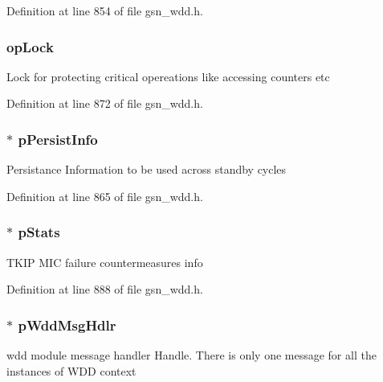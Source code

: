 Definition at line 854 of file gsn\_\-wdd.h.

\hypertarget{a00108_af54b39138c2e6c795c0f67af296e8235}{
\subsubsection[{opLock}]{ {\bf opLock}}}
\label{a00108_af54b39138c2e6c795c0f67af296e8235}
Lock for protecting critical opereations like accessing counters etc 

Definition at line 872 of file gsn\_\-wdd.h.

\hypertarget{a00108_a2352b6f9dfcf66ea61b2b20760fed0c4}{
\subsubsection[{pPersistInfo}]{$\ast$ {\bf pPersistInfo}}}
\label{a00108_a2352b6f9dfcf66ea61b2b20760fed0c4}
Persistance Information to be used across standby cycles 

Definition at line 865 of file gsn\_\-wdd.h.

\hypertarget{a00108_a2025526a9c36139e30df4edb6fe32c64}{
\subsubsection[{pStats}]{$\ast$ {\bf pStats}}}
\label{a00108_a2025526a9c36139e30df4edb6fe32c64}
TKIP MIC failure countermeasures info 

Definition at line 888 of file gsn\_\-wdd.h.

\hypertarget{a00108_a6978c51a66d7b07a4fa1a13f9af82548}{
\subsubsection[{pWddMsgHdlr}]{$\ast$ {\bf pWddMsgHdlr}}}
\label{a00108_a6978c51a66d7b07a4fa1a13f9af82548}
wdd module message handler Handle. There is only one message for all the instances of WDD context 

